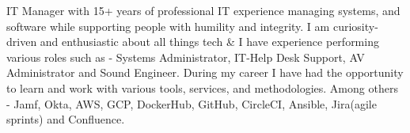 

\begin{cvparagraph}

	IT Manager with 15+ years of professional IT experience managing systems, and software while supporting people with humility and integrity. I am curiosity-driven and enthusiastic about all things tech \& I have experience performing various roles such as - Systems Administrator, IT-Help Desk Support, AV Administrator and Sound Engineer. During my career I have had the opportunity to learn and work with various tools, services, and methodologies. Among others - Jamf, Okta, AWS, GCP, DockerHub, GitHub, CircleCI, Ansible, Jira(agile sprints) and Confluence.
\end{cvparagraph}
